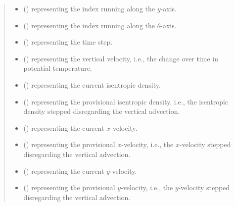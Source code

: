 \documentclass[letterpaper,10pt,english]{sphinxmanual}
\begin{document}
\begin{fulllineitems}
\begin{fulllineitems}
\begin{quote}
\begin{description}
\begin{itemize}
\item {} 
 () \textendash{}  representing the index running along the \(y\)-axis.

\item {} 
 () \textendash{}  representing the index running along the \(\theta\)-axis.

\item {} 
 () \textendash{}  representing the time step.

\item {} 
 () \textendash{}  representing the vertical velocity, i.e.,
the change over time in potential temperature.

\item {} 
 () \textendash{}  representing the current isentropic density.

\item {} 
 () \textendash{}  representing the provisional isentropic density, i.e.,
the isentropic density stepped disregarding the vertical advection.

\item {} 
 () \textendash{}  representing the current \(x\)-velocity.

\item {} 
 () \textendash{}  representing the provisional \(x\)-velocity, i.e.,
the \(x\)-velocity stepped disregarding the vertical advection.

\item {} 
 () \textendash{}  representing the current \(y\)-velocity.

\item {} 
 () \textendash{}  representing the provisional \(y\)-velocity, i.e.,
the \(y\)-velocity stepped disregarding the vertical advection.


\end{itemize}
\end{description}
\end{quote}
\end{fulllineitems}
\end{fulllineitems}
\end{document}
